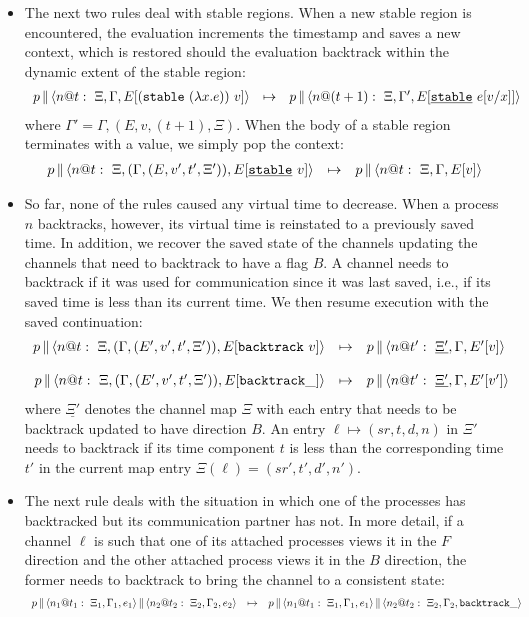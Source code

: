 \documentclass{article}
\begin{document}
\begin{itemize}
\item The next two rules deal with stable regions. When a new stable region
  is encountered, the evaluation increments the timestamp and saves a new
  context, which is restored should the evaluation backtrack within the
  dynamic extent of the stable region:
\[\begin{array}{rcl}
  \parc{p}{\proc{n}{\Gamma}{\Xi}{E[(\stable{(\lambda x.e)})~v]}{t}} &\mapsto&
  \parc{p}{\proc{n}{\Gamma'}{\Xi}{E[\stableu{e[v/x]}]}{(t+1)}} 
\end{array}\]
where $\Gamma' = \Gamma,(E,v,(t+1),\Xi)$. When the body of a stable 
region terminates with a value, we simply pop the context:
\[\begin{array}{rcl}
  \parc{p}{\proc{n}{(\Gamma,(E,v',t',\Xi'))}{\Xi}{E[\stableu{v}]}{t}} 
  &\mapsto& 
  \parc{p}{\proc{n}{\Gamma}{\Xi}{E[v]}{t}} 
\end{array}\]

\item So far, none of the rules caused any virtual time to decrease. When a
  process $n$ backtracks, however, its virtual time is reinstated to a
  previously saved time. In addition, we recover the saved state of the
  channels updating the channels that need to backtrack to have a flag $B$. A
  channel needs to backtrack if it was used for communication since it was
  last saved, i.e., if its saved time is less than its current time. We then
  resume execution with the saved continuation:
\[\begin{array}{rcl}
  \parc{p}{\proc{n}{(\Gamma,(E',v',t',\Xi'))}{\Xi}{E[\backtrack{v}]}{t}} 
  &\mapsto& 
  \parc{p}{\proc{n}{\Gamma}{\underline{\Xi'}}{E'[v]}{t'}} \\
\\
  \parc{p}{\proc{n}{(\Gamma,(E',v',t',\Xi'))}{\Xi}{E[\abacktrack]}{t}} 
  &\mapsto& 
  \parc{p}{\proc{n}{\Gamma}{\underline{\Xi'}}{E'[v']}{t'}} 
\end{array}\]
where $\underline{\Xi'}$ denotes the channel map $\Xi$ with each entry that
needs to be backtrack updated to have direction $B$. An entry $\ell \mapsto
(sr,t,d,n)$ in $\Xi'$ needs to backtrack if its time component $t$ is less
than the corresponding time $t'$ in the current map entry $\Xi(\ell) =
(sr',t',d',n')$.

\item The next rule deals with the situation in which one of the
  processes has backtracked but its communication partner has not. In more
  detail, if a channel $\ell$ is such that one of its attached processes
  views it in the $F$ direction and the other attached process views it in
  the $B$ direction, the former needs to backtrack to bring the channel to a
  consistent state:
\[\begin{array}{rcl}
\parc{p}
  {\parc{\proc{n_1}{\Gamma_1}{\Xi_1}{e_1}{t_1}}
  {\proc{n_2}{\Gamma_2}{\Xi_2}{e_2}{t_2}}} &\mapsto& 
\parc{p}
  {\parc{\proc{n_1}{\Gamma_1}{\Xi_1}{e_1}{t_1}}
  {\proc{n_2}{\Gamma_2}{\Xi_2}{\abacktrack}{t_2}}} 
\end{array}\]


\end{itemize}
\end{document}
